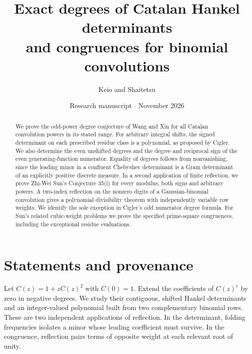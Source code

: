\documentclass[11pt,a4paper]{article}
\title{\color{ink}\bfseries Exact degrees of Catalan Hankel determinants\\[3pt] and congruences for binomial convolutions}
\author{Keio and Shaitetsu}
\date{Research manuscript \enspace$\cdot$\enspace 20 November 2026}
\theoremstyle{definition}\newtheorem{problem}[theorem]{Auxiliary problem}
\theoremstyle{remark}\newtheorem*{remark}{Remark}
\begin{document}
\maketitle
\begin{abstract}
We prove the odd-power degree conjecture of Wang and Xin for all Catalan convolution powers in its stated range. For arbitrary integral shifts, the signed determinant on each prescribed residue class is a polynomial, as proposed by Cigler. We also determine the even unshifted degrees and the degree and reciprocal sign of the even generating-function numerator. Equality of degrees follows from nonvanishing, since the leading minor in a confluent Chebyshev determinant is a Gram determinant of an explicitly positive discrete measure. In a second application of finite reflection, we prove Zhi-Wei Sun's Conjecture 35(i) for every modulus, both signs and arbitrary powers. A two-index reflection on the nonzero digits of a Gaussian-binomial convolution gives a polynomial divisibility theorem with independently variable row weights. We identify the sole exception in Cigler's odd numerator degree formula. For Sun's related cubic-weight problems we prove the specified prime-square congruences, including the exceptional residue evaluations.
\end{abstract}

\section{Statements and provenance}
Let $C(z)=1+zC(z)^2$ with $C(0)=1$. Extend the coefficients of $C(z)^r$ by zero in negative degrees. We study their contiguous, shifted Hankel determinants and an integer-valued polynomial built from two complementary binomial rows. These are two independent applications of reflection. In the determinant, folding frequencies isolates a minor whose leading coefficient must survive. In the congruence, reflection pairs terms of opposite weight at each relevant root of unity.
\end{document}

